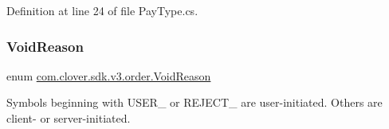 Definition at line 24 of file Pay\+Type.\+cs.

\mbox{\label{namespacecom_1_1clover_1_1sdk_1_1v3_1_1order_acb5aac0c1f6aeeb5b636223a69d2dec2}} 
\subsubsection{\texorpdfstring{Void\+Reason}{VoidReason}}
{\footnotesize\ttfamily enum \hyperlink{namespacecom_1_1clover_1_1sdk_1_1v3_1_1order_acb5aac0c1f6aeeb5b636223a69d2dec2}{com.\+clover.\+sdk.\+v3.\+order.\+Void\+Reason}\hspace{0.3cm}{\ttfamily [strong]}}



Symbols beginning with U\+S\+E\+R\+\_\+ or R\+E\+J\+E\+C\+T\+\_\+ are user-\/initiated. Others are client-\/ or server-\/initiated. 

